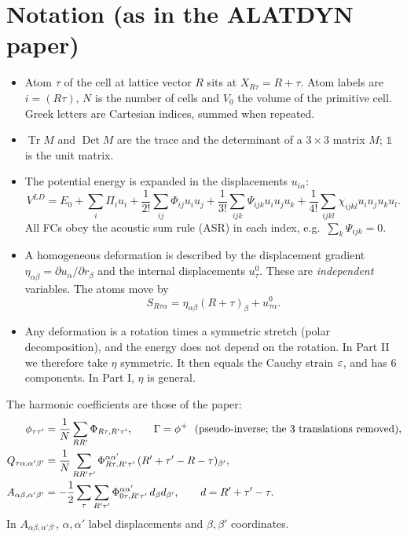 \documentclass[11pt,a4paper]{article}
\newcommand{\al}{\alpha}\newcommand{\be}{\beta}\newcommand{\ga}{\gamma}\newcommand{\de}{\delta}
\newcommand{\Tr}{\operatorname{Tr}}
\newcommand{\Det}{\operatorname{Det}}
\newcommand{\Id}{\mathbb{1}}
\begin{document}
\section{Notation (as in the ALATDYN paper)}
\begin{itemize}
\item Atom $\tau$ of the cell at lattice vector $R$ sits at $X_{R\tau}=R+\tau$. Atom labels are $i=(R\tau)$,
  $N$ is the number of cells and $V_0$ the volume of the primitive cell. Greek letters are Cartesian
  indices, summed when repeated.
\item $\Tr M$ and $\Det M$ are the trace and the determinant of a $3\times3$ matrix $M$; $\Id$ is the unit matrix.
\item The potential energy is expanded in the displacements $u_{i\al}$:
\begin{equation}
V^{LD}=E_0+\sum_i\Pi_iu_i+\frac1{2!}\sum_{ij}\Phi_{ij}u_iu_j+\frac1{3!}\sum_{ijk}\Psi_{ijk}u_iu_ju_k
+\frac1{4!}\sum_{ijkl}\chi_{ijkl}u_iu_ju_ku_l .
\label{eq:VLD}
\end{equation}
  All FCs obey the acoustic sum rule (ASR) in each index, e.g.\ $\sum_k\Psi_{ijk}=0$.
\item A homogeneous deformation is described by the displacement gradient
  $\eta_{\al\be}=\partial u_\al/\partial r_\be$ and the internal displacements $u^0_\tau$. These are
  \emph{independent} variables. The atoms move by
\begin{equation}
S_{R\tau\al}=\eta_{\al\be}(R+\tau)_\be+u^0_{\tau\al}.
\label{eq:S}
\end{equation}
\item Any deformation is a rotation times a symmetric stretch (polar decomposition), and the energy
  does not depend on the rotation. In Part II we therefore take $\eta$ symmetric. It then equals the
  Cauchy strain $\varepsilon$, and has 6 components. In Part I, $\eta$ is general.
\end{itemize}
The harmonic coefficients are those of the paper:
\begin{align}
\phi_{\tau\tau'}&=\frac1N\sum_{RR'}\Phi_{R\tau,R'\tau'},\qquad
\Ga=\phi^{+}\ \ (\text{pseudo-inverse; the 3 translations removed}),\nonumber\\
Q_{\tau\al;\al'\be'}&=\frac1N\sum_{RR'\tau'}\Phi^{\al\al'}_{R\tau,R'\tau'}\,(R'+\tau'-R-\tau)_{\be'},\label{eq:AQphi}\\
A_{\al\be,\al'\be'}&=-\frac12\sum_{\tau}\sum_{R'\tau'}\Phi^{\al\al'}_{0\tau,R'\tau'}\,d_\be d_{\be'},
\qquad d=R'+\tau'-\tau .\nonumber
\end{align}
In $A_{\al\be,\al'\be'}$, $\al,\al'$ label displacements and $\be,\be'$ coordinates.
\end{document}
